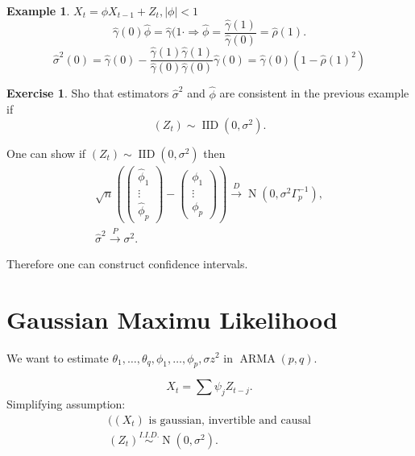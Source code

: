 \documentclass[12pt,a4paper, notitlepage]{book}
\theoremstyle{definition} %
\newtheorem{example}[definition]{Example}
\newtheorem{exercise}[definition]{Exercise}
\theoremstyle{plain} %
\DeclareMathOperator{\No}{N}
\DeclareMathOperator{\Iid}{IID}
\DeclareMathOperator{\Arma}{ARMA}
\begin{document}
\begin{example}
$ X_t = \phi X_{t-1} + Z_t, | \phi | < 1 $
\[ \hat{\gamma}(0)  \hat{\phi} = \hat{\gamma}(1· \Rightarrow \hat{\phi} = \frac{\hat{\gamma}(1)}{ \hat{\gamma}(0)} = \hat{\rho}(1) . \]
\[ \hat{ \sigma} ^2(0) = \hat{\gamma}(0)  - \frac{ \hat{\gamma}(1) \hat{\gamma}(1)}{\hat{\gamma}(0) \hat{\gamma}(0)} \hat{\gamma}(0) = \hat{\gamma}(0) ( 1 - \hat{\rho}(1)^2) \]
\end{example}


\begin{exercise}
Sho that estimators $ \hat{\sigma}^2 $ and $ \hat{\phi} $ are consistent in the previous example if 
\[ (Z_t) \sim \Iid(0, \sigma^2) . \]
\end{exercise}

One can show if $  (Z_t) \sim \Iid(0, \sigma ^2) $  then
\begin{align*} 
\sqrt{n} \left( \left( \begin{array} {c} \hat{\phi}_1 \\ \vdots \\ \hat{\phi} _p \end{array} \right) - \left( \begin{array}{c} \phi _1 \\ \vdots \\ \phi _p \end{array} \right) \right) \overset{D}{\rightarrow } \No(0, \sigma^2 \Gamma_p ^{-1} ) , \\
\hat{\sigma}^2 \overset{P}{\rightarrow} \sigma^2  .
\end{align*}

Therefore one can construct confidence intervals.


\section{Gaussian Maximu Likelihood}

We want to estimate $ \theta _1, \ldots , \theta _q, \phi _1, \ldots , \phi _p, \sigma z^2 $ in $ \Arma(p,q) $.

\[ X_t = \sum \psi _j Z_{t-j} . \]
Simplifying assumption:
\begin{align*}
 ((X_t) \text{ is gaussian, invertible and causal} \\
(Z_t) \overset{I.I.D.}{\sim} \No(0, \sigma^2) .
\end{align*}
\end{document}
